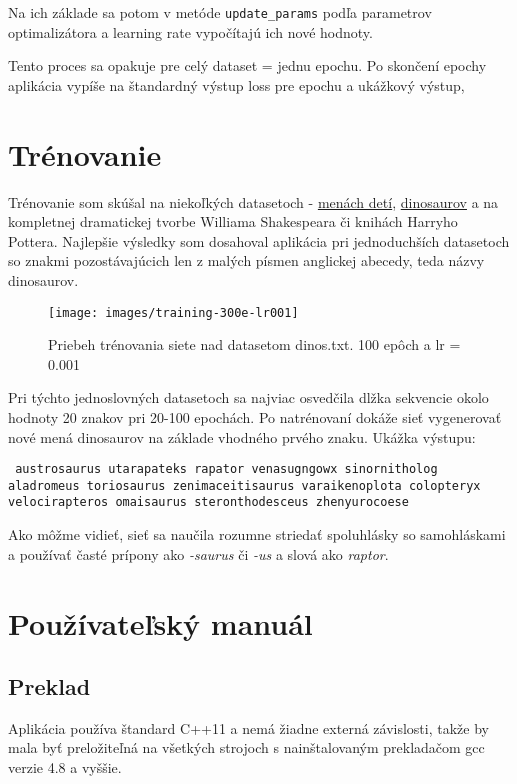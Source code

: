 \documentclass[12pt,a4paper]{article}
\begin{document}
	Na ich základe sa potom v metóde \texttt{update\_params} podľa parametrov optimalizátora a learning rate vypočítajú ich nové hodnoty.
	
	Tento proces sa opakuje pre celý dataset = jednu epochu. Po skončení epochy aplikácia vypíše na štandardný výstup loss pre epochu a ukážkový výstup,

\section{Trénovanie}
	Trénovanie som skúšal na niekoľkých datasetoch - \href{https://www.kaggle.com/kaggle/us-baby-names?select=NationalNames.csv}{menách detí}, \href{https://www.kaggle.com/kumazaki98/dinosaur-list}{dinosaurov} a na kompletnej dramatickej tvorbe Williama Shakespeara či knihách Harryho Pottera. Najlepšie výsledky som dosahoval aplikácia pri jednoduchších datasetoch so znakmi pozostávajúcich len z malých písmen anglickej abecedy, teda názvy dinosaurov.
	
	\begin{figure}[h]
		\centering
		\texttt{[image: images/training-300e-lr001]}
		\caption{Priebeh trénovania siete nad datasetom dinos.txt. 100 epôch a lr = 0.001}
		\label{fig:training-100e-lr0001}
	\end{figure}
	
	Pri týchto jednoslovných datasetoch sa najviac osvedčila dlžka sekvencie okolo hodnoty 20 znakov pri 20-100 epochách. Po natrénovaní dokáže sieť vygenerovať nové mená dinosaurov na základe vhodného prvého znaku. Ukážka výstupu:
	
	\texttt{
		austrosaurus
		utarapateks
		rapator
		venasugngowx
		sinornitholog
		aladromeus
		toriosaurus
		zenimaceitisaurus
		varaikenoplota
		colopteryx
		velocirapteros
		omaisaurus
		steronthodesceus
		zhenyurocoese 
	}

	Ako môžme vidieť, sieť sa naučila rozumne striedať spoluhlásky so samohláskami a používať časté prípony ako \textit{-saurus} či \textit{-us} a slová ako \textit{raptor}.

\section{Používateľský manuál}
	\subsection{Preklad}
	Aplikácia používa štandard C++11 a nemá žiadne externá závislosti, takže by mala byť preložiteľná na všetkých strojoch s nainštalovaným prekladačom gcc verzie 4.8 a vyššie.
		
\end{document}
